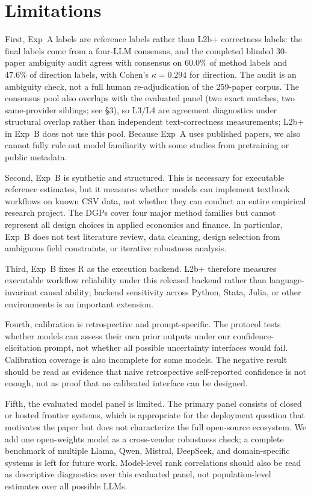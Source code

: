 \documentclass{article}
\begin{document}
\section{Limitations}
\label{sec:limitations}

First, Exp~A labels are reference labels rather than L2b+ correctness
labels: the final labels come from a four-LLM consensus, and the
completed blinded 30-paper ambiguity audit agrees with consensus on
60.0\% of method labels and 47.6\% of direction labels, with Cohen's
$\kappa = 0.294$ for direction. The audit is an ambiguity check, not a
full human re-adjudication of the 259-paper corpus. The consensus pool
also overlaps with the evaluated panel (two exact matches, two
same-provider siblings; see §3), so L3/L4 are agreement diagnostics
under structural overlap rather than independent text-correctness
measurements; L2b+ in Exp~B does not use this pool. Because Exp~A uses
published papers, we also cannot fully rule out model familiarity with
some studies from pretraining or public metadata.

Second, Exp~B is synthetic and structured. This is necessary for
executable reference estimates, but it measures whether models can
implement textbook workflows on known CSV data, not whether they can conduct an
entire empirical research project. The DGPs cover four major method
families but cannot represent all design choices in applied economics
and finance. In particular, Exp~B does not test literature review, data
cleaning, design selection from ambiguous field constraints, or
iterative robustness analysis.

Third, Exp~B fixes R as the execution backend. L2b+ therefore measures
executable workflow reliability under this released backend rather than
language-invariant causal ability; backend sensitivity across Python, Stata,
Julia, or other environments is an important extension.

Fourth, calibration is retrospective and prompt-specific. The protocol
tests whether models can assess their own prior outputs under our
confidence-elicitation prompt, not whether all possible uncertainty
interfaces would fail. Calibration coverage is also incomplete for some
models. The negative result should be read as evidence that naive
retrospective self-reported confidence is not enough, not as proof that no
calibrated interface can be designed.

Fifth, the evaluated model panel is limited. The primary panel consists
of closed or hosted frontier systems, which is appropriate for the
deployment question that motivates the paper but does not characterize
the full open-source ecosystem. We add one open-weights model as a
cross-vendor robustness check; a complete benchmark of multiple Llama,
Qwen, Mistral, DeepSeek, and domain-specific systems is left for future
work. Model-level rank correlations should also be read as descriptive
diagnostics over this evaluated panel, not population-level estimates
over all possible LLMs.
\end{document}
